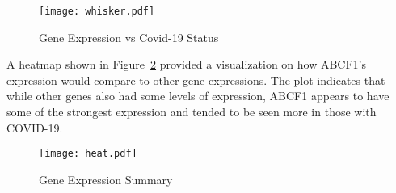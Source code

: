 \documentclass{article}
\begin{document}
\begin{figure}[H]
  \centering
  \texttt{[image: whisker.pdf]}
  \caption{Gene Expression vs Covid-19 Status}
  \label{fig:4}
\end{figure}

A heatmap shown in Figure~\ref{fig: Figure 4} provided a visualization on how ABCF1's expression would compare to other gene expressions. The plot indicates that while other genes also had some levels of expression, ABCF1 appears to have some of the strongest expression and tended to be seen more in those with COVID-19.

\begin{figure}[H]
  \centering
  \texttt{[image: heat.pdf]}
  \caption{Gene Expression Summary}
  \label{fig: Figure 4}
\end{figure}



\end{document}

